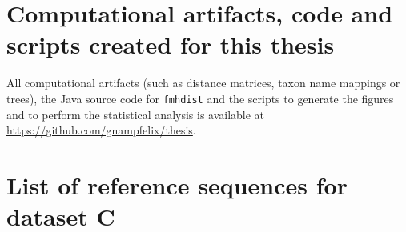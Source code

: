 \section{Computational artifacts, code and scripts created for this thesis}
All computational artifacts (such as distance matrices, taxon name mappings or
trees), the Java source code for \texttt{fmhdist} and the scripts to generate
the figures and to perform the statistical analysis is available at
\url{https://github.com/gnampfelix/thesis}.

\section{List of reference sequences for dataset C}
\label{sec:refseq}
